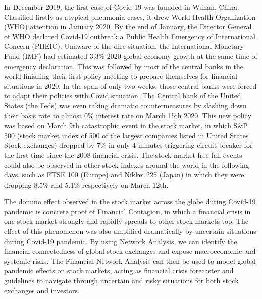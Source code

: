 \documentclass[a4paper,11pt]{article}
\begin{document}
In December 2019, the first case of Covid-19 was founded in Wuhan, China. 
Classified firstly as atypical pneumonia cases, it drew World Health Organization (WHO) attention in January 2020.
By the end of January, the Director General of WHO declared Covid-19 outbreak a Public Health Emergency of International Concern (PHEIC).  \cite{WHOTimeline} 
Unaware of the dire situation, the International Monetary Fund (IMF) had estimated 3.3\% 2020 global economy growth at the same time of emergency declaration. \cite{IMFEstimation} 
This was followed by most of the central banks in the world finishing their first policy meeting to prepare themselves for financial situations in 2020. \cite{CentralBankTimeline}
In the span of only two weeks, those central banks were forced to adapt their policies with Covid situation. The Central bank of the United States (the Feds) was even taking dramatic countermeasures by slashing down their basis rate to almost 0\% interest rate on March 15th 2020. This new policy was based on March 9th catastrophic event in the stock market, in which S\&P 500 (stock market index of 500 of the largest companies listed in United States Stock exchanges) dropped by 7\% in only 4 minutes triggering circuit breaker for the first time since the 2008 financial crisis. \cite{SAMITAS2022102005} 
The stock market free-fall events could also be observed in other stock indexes around the world in the following days, such as FTSE 100 (Europe) and Nikkei 225 (Japan) in which they were dropping 8.5\% and 5.1\% respectively on March 12th.

The domino effect observed in the stock market across the globe during Covid-19 pandemic is concrete proof of Financial Contagion, in which a financial crisis in one stock market strongly and rapidly spreads to other stock markets too. \cite{KOLLMANN2013139} 
The effect of this phenomenon was also amplified dramatically by uncertain situations during Covid-19 pandemic. By using Network Analysis, we can identify the financial connectedness of global stock exchanges and expose macroeconomic and systemic risks. \cite{RIZWAN2020101682}
The Financial Network Analysis can then be used to model global pandemic effects on stock markets, acting as financial crisis forecaster and guidelines to navigate through uncertain and risky situations for both stock exchanges and investors. 
\end{document}
